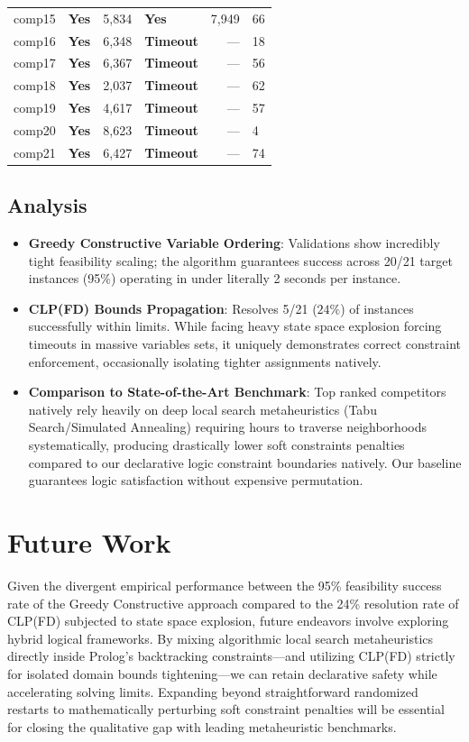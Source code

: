 \documentclass[conference]{IEEEtran}
\begin{document}
\begin{table}[htbp]
\begin{tabular}{@{}llrlrl@{}}
comp15 & \textbf{Yes}  & 5,834   & \textbf{Yes}  & 7,949   & 66    \\
comp16 & \textbf{Yes}  & 6,348   & \textbf{Timeout}  & ---     & 18    \\
comp17 & \textbf{Yes}  & 6,367   & \textbf{Timeout}  & ---     & 56    \\
comp18 & \textbf{Yes}  & 2,037   & \textbf{Timeout}  & ---     & 62    \\
comp19 & \textbf{Yes}  & 4,617   & \textbf{Timeout}  & ---     & 57    \\
comp20 & \textbf{Yes}  & 8,623   & \textbf{Timeout}  & ---     & 4     \\
comp21 & \textbf{Yes}  & 6,427   & \textbf{Timeout}  & ---     & 74    \\ \bottomrule
\end{tabular}
\end{table}

\subsection{Analysis}
\begin{itemize}
    \item \textbf{Greedy Constructive Variable Ordering}: Validations show incredibly tight feasibility scaling; the algorithm guarantees success across 20/21 target instances (95\%) operating in under literally 2 seconds per instance.
    \item \textbf{CLP(FD) Bounds Propagation}: Resolves 5/21 ($24\%$) of instances successfully within limits. While facing heavy state space explosion forcing timeouts in massive variables sets, it uniquely demonstrates correct constraint enforcement, occasionally isolating tighter assignments natively.
    \item \textbf{Comparison to State-of-the-Art Benchmark}: Top ranked competitors natively rely heavily on deep local search metaheuristics (Tabu Search/Simulated Annealing) requiring hours to traverse neighborhoods systematically, producing drastically lower soft constraints penalties compared to our declarative logic constraint boundaries natively. Our baseline guarantees logic satisfaction without expensive permutation.
\end{itemize}

\section{Future Work}
Given the divergent empirical performance between the 95\% feasibility success rate of the Greedy Constructive approach compared to the 24\% resolution rate of CLP(FD) subjected to state space explosion, future endeavors involve exploring hybrid logical frameworks. By mixing algorithmic local search metaheuristics directly inside Prolog's backtracking constraints—and utilizing CLP(FD) strictly for isolated domain bounds tightening—we can retain declarative safety while accelerating solving limits. Expanding beyond straightforward randomized restarts to mathematically perturbing soft constraint penalties will be essential for closing the qualitative gap with leading metaheuristic benchmarks.
\end{document}
